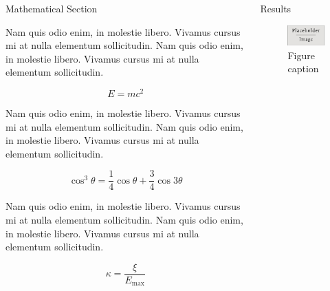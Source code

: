 \documentclass[final]{beamer}
\newlength{\onecolwid}
\newlength{\twocolwid}
\begin{document}
\begin{frame}[t]
\begin{columns}[t]
\begin{column}{\twocolwid}
\begin{columns}[t,totalwidth=\twocolwid]
\begin{column}{\onecolwid}
\begin{block}{Mathematical Section}

Nam quis odio enim, in molestie libero. Vivamus cursus mi at nulla elementum sollicitudin. Nam quis odio enim, in molestie libero. Vivamus cursus mi at nulla elementum sollicitudin.
  
\begin{equation}
E = mc^{2}
\label{eqn:Einstein}
\end{equation}

Nam quis odio enim, in molestie libero. Vivamus cursus mi at nulla elementum sollicitudin. Nam quis odio enim, in molestie libero. Vivamus cursus mi at nulla elementum sollicitudin.

\begin{equation}
\cos^3 \theta =\frac{1}{4}\cos\theta+\frac{3}{4}\cos 3\theta
\label{eq:refname}
\end{equation}

Nam quis odio enim, in molestie libero. Vivamus cursus mi at nulla elementum sollicitudin. Nam quis odio enim, in molestie libero. Vivamus cursus mi at nulla elementum sollicitudin.

\begin{equation}
\kappa =\frac{\xi}{E_{\mathrm{max}}} %
\end{equation}

\end{block}


\end{column} %

\begin{column}{\onecolwid} %


\begin{block}{Results}

\begin{figure}
\includegraphics[width=0.8\linewidth]{placeholder.jpg}
\caption{Figure caption}
\end{figure}


\end{block}
\end{column}
\end{columns}
\end{column}
\end{columns}
\end{frame}
\end{document}
